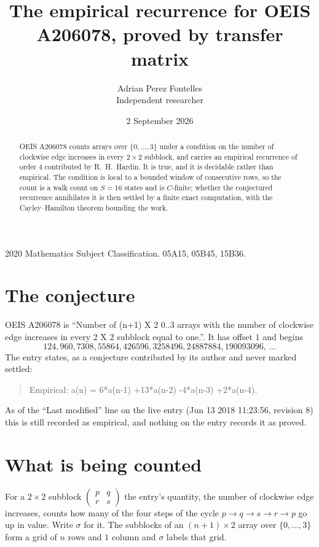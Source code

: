 \documentclass[11pt,a4paper]{article}
\title{The empirical recurrence for OEIS A206078, proved by transfer matrix}
\author{Adrian Perez Fontelles\\ \small Independent researcher}
\date{2 September 2026}
\theoremstyle{plain}
\theoremstyle{definition}
\begin{document}
\maketitle

\begin{abstract}
OEIS A206078 counts arrays over $\{0,\dots,3\}$ under a condition on the number of clockwise edge increases
in every $2\times2$ subblock, and carries an empirical recurrence of order $4$ contributed by
R.~H.~Hardin. It is true, and it is decidable rather than empirical. The condition is local to
a bounded window of consecutive rows, so the count is a walk count on $S=16$ states and is
$C$-finite; whether the conjectured recurrence annihilates it is then settled by a finite exact
computation, with the Cayley--Hamilton theorem bounding the work.
\end{abstract}

\noindent\small 2020 Mathematics Subject Classification. 05A15, 05B45, 15B36.\normalsize

\section{The conjecture}

OEIS A206078 is ``Number of (n+1) X 2 0..3 arrays with the number of clockwise edge increases in every 2 X 2 subblock equal to one.''. It has offset $1$ and begins
\[
124, 960, 7308, 55864, 426596, 3258496, 24887884, 190093096,\ \dots
\]
The entry states, as a conjecture contributed by its author and never marked settled:
\begin{quote}
Empirical: a(n) = 6*a(n-1) +13*a(n-2) -4*a(n-3) +2*a(n-4).
\end{quote}
As of the ``Last modified'' line on the live entry (Jun 13 2018 11:23:56, revision 8) this is still
recorded as empirical, and nothing on the entry records it as proved.

\section{What is being counted}

For a $2\times2$ subblock $\begin{pmatrix}p&q\\r&s\end{pmatrix}$ the
entry's quantity, the number of clockwise edge increases, counts how many of the four steps of the cycle $p\to q\to s\to r\to p$ go up in value. Write $\sigma$ for it. The subblocks of an
$(n+1)\times2$ array over $\{0,\dots,3\}$ form a grid of $n$ rows and $1$
column and $\sigma$ labels that grid.
\end{document}
